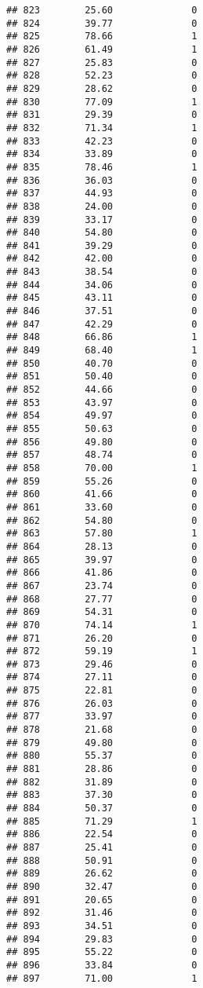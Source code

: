 \documentclass[
]{article}
\begin{document}
\begin{verbatim}
## 823        25.60              0
## 824        39.77              0
## 825        78.66              1
## 826        61.49              1
## 827        25.83              0
## 828        52.23              0
## 829        28.62              0
## 830        77.09              1
## 831        29.39              0
## 832        71.34              1
## 833        42.23              0
## 834        33.89              0
## 835        78.46              1
## 836        36.03              0
## 837        44.93              0
## 838        24.00              0
## 839        33.17              0
## 840        54.80              0
## 841        39.29              0
## 842        42.00              0
## 843        38.54              0
## 844        34.06              0
## 845        43.11              0
## 846        37.51              0
## 847        42.29              0
## 848        66.86              1
## 849        68.40              1
## 850        40.70              0
## 851        50.40              0
## 852        44.66              0
## 853        43.97              0
## 854        49.97              0
## 855        50.63              0
## 856        49.80              0
## 857        48.74              0
## 858        70.00              1
## 859        55.26              0
## 860        41.66              0
## 861        33.60              0
## 862        54.80              0
## 863        57.80              1
## 864        28.13              0
## 865        39.97              0
## 866        41.86              0
## 867        23.74              0
## 868        27.77              0
## 869        54.31              0
## 870        74.14              1
## 871        26.20              0
## 872        59.19              1
## 873        29.46              0
## 874        27.11              0
## 875        22.81              0
## 876        26.03              0
## 877        33.97              0
## 878        21.68              0
## 879        49.80              0
## 880        55.37              0
## 881        28.86              0
## 882        31.89              0
## 883        37.30              0
## 884        50.37              0
## 885        71.29              1
## 886        22.54              0
## 887        25.41              0
## 888        50.91              0
## 889        26.62              0
## 890        32.47              0
## 891        20.65              0
## 892        31.46              0
## 893        34.51              0
## 894        29.83              0
## 895        55.22              0
## 896        33.84              0
## 897        71.00              1

\end{verbatim}
\end{document}

